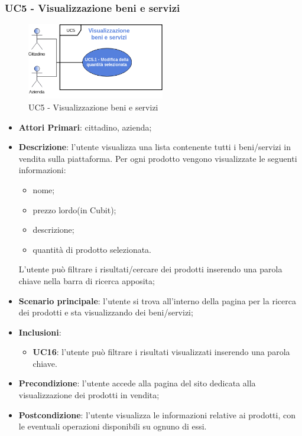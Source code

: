  \subsubsection{UC5 - Visualizzazione beni e servizi}
  \begin{figure}[H]
 	\includegraphics[width=6cm]{res/images/UC5-Generale.png}
 	\centering
 	\caption{UC5 - Visualizzazione beni e servizi}
 \end{figure}
 \begin{itemize}
 	\item \textbf{Attori Primari}: cittadino, azienda;
 	\item \textbf{Descrizione}: l'utente visualizza una lista contenente tutti i beni/servizi in vendita sulla piattaforma. Per ogni prodotto vengono visualizzate le seguenti informazioni:
 	\begin{itemize}
 		\item nome;
 		\item prezzo lordo\glosp (in Cubit\glo);
 		\item descrizione;
 		\item quantità di prodotto selezionata.
 	\end{itemize}
 	L'utente può filtrare i risultati/cercare dei prodotti inserendo una parola chiave nella barra di ricerca apposita;
 	\item \textbf{Scenario principale}: l'utente si trova all'interno della pagina per la ricerca dei prodotti e sta visualizzando dei beni/servizi;
	\item \textbf{Inclusioni}:
	\begin{itemize}
		\item \textbf{UC16}: l'utente può filtrare i risultati visualizzati inserendo una parola chiave.
	\end{itemize}
 	\item \textbf{Precondizione}: l'utente accede alla pagina del sito dedicata alla visualizzazione dei prodotti in vendita;
 	\item \textbf{Postcondizione}: l'utente visualizza le informazioni relative ai prodotti, con le eventuali operazioni disponibili su ognuno di essi.
 \end{itemize}
